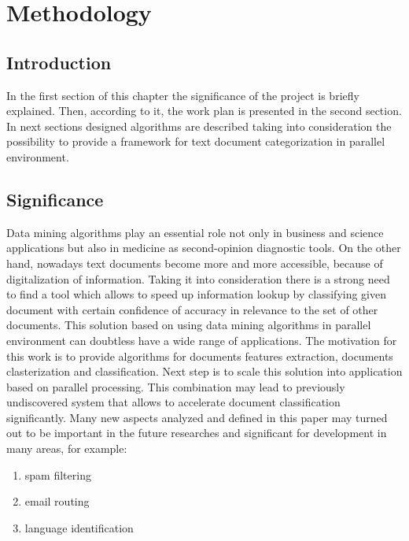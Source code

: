 \chapter{Methodology}
\label{methodology}

\section{Introduction}
In the first section of this chapter the significance of the project is briefly explained. Then, according to it, the work plan is presented in the second section.  In next sections designed algorithms are described taking into consideration the possibility to provide a framework for text document categorization in parallel environment. 

\section{Significance}
Data mining algorithms play an essential role not only in business and science applications but also in medicine as second-opinion diagnostic tools. On the other hand, nowadays text documents become more and more accessible, because of digitalization of information. Taking it into consideration there is a strong need to find a tool which allows to speed up information lookup by classifying given document with certain confidence of accuracy in relevance to the set of other documents. This solution based on using data mining algorithms in parallel environment can doubtless have a wide range of applications. The motivation for this work is to provide algorithms for documents features extraction, documents clasterization and classification. Next step is to scale this solution into application based on parallel processing. This combination may lead to previously undiscovered system that allows to accelerate   document classification significantly. Many new aspects analyzed and defined in this paper may turned out to be important in the future researches and significant for development in many areas, for example:
\begin{enumerate}

\item spam filtering

\item email routing

\item language identification


\end{enumerate}


